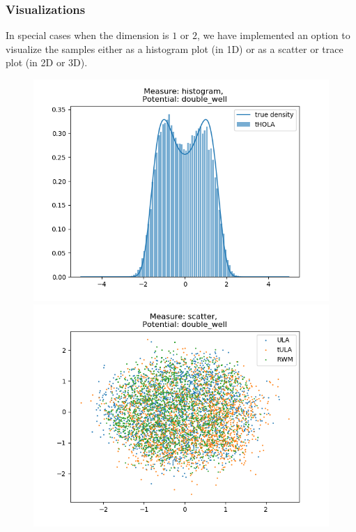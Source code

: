 \subsubsection{Visualizations}
In special cases when the dimension is $1$ or $2$, we have implemented an option to visualize the samples either as a histogram plot (in 1D) or as a scatter or trace plot (in 2D or 3D).


\begin{figure}[H]
\centering
  \begin{minipage}[b]{0.3\textwidth}
  \centering
    \includegraphics[width=\textwidth]{Figures/histo_example.png}
  \end{minipage} %
  \begin{minipage}[b]{0.3\textwidth}
  \centering
    \includegraphics[width=\textwidth]{Figures/scatter_example.png}

\end{minipage}
\end{figure}

